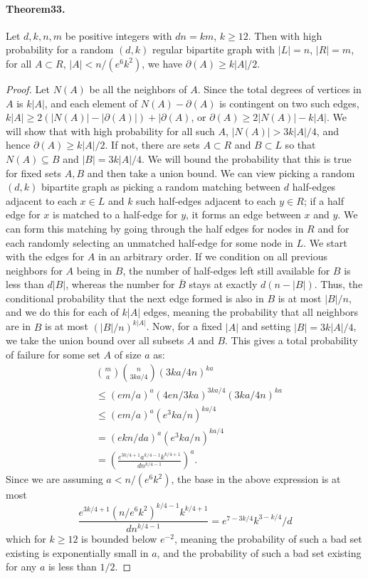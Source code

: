 \documentclass[10pt,a4paper]{article}
\begin{document}
\paragraph{Theorem33.} Let $d,k,n,m$ be positive integers with $dn=km$, $k\geq12$. Then with high probability for a random $(d,k)$ regular bipartite graph with $|L|=n$, $|R|=m$, for all $A\subset R$, $|A|<n/(e^6k^2)$, we have $\partial(A)\geq k|A|/2$.
\begin{proof}
Let $N(A)$ be all the neighbors of $A$. Since the total degrees of vertices in $A$ is $k|A|$, and each element of $N(A)-\partial(A)$ is contingent on two such edges, $k|A|\geq2(|N(A)|-|\partial(A)|)+|\partial(A)$, or $\partial(A)\geq2|N(A)|-k|A|$. We will show that with high probability for all such $A$, $|N(A)|>3k|A|/4$, and hence $\partial(A)\geq k|A|/2$.
If not, there are sets $A\subset R$ and $B\subset L$ so that $N(A)\subseteq B$ and $|B|=3k|A|/4$. We will bound the probability that this is true for fixed sets $A,B$ and then take a union bound. We can view picking a random $(d,k)$ bipartite graph as picking a random matching between $d$ half-edges adjacent to each $x\in L$ and $k$ such half-edges adjacent to each $y\in R$; if a half edge for $x$ is matched to a half-edge for $y$, it forms an edge between $x$ and $y$.
We can form this matching by going through the half edges for nodes in $R$ and for each randomly selecting an unmatched half-edge for some node in $L$. We start with the edges for $A$ in an arbitrary order. If we condition on all previous neighbors for $A$ being in $B$, the number of half-edges left still available for $B$ is less than $d|B|$, whereas the number for $\bar B$ stays at exactly $d(n-|B|)$. Thus, the conditional probability that the next edge formed is also in $B$ is at most $|B|/n$, and we do this for each of $k|A|$ edges, meaning the probability that all neighbors are in $B$ is at most $(|B|/n)^{k|A|}$.
Now, for a fixed $|A|$ and setting $|B|=3k|A|/4$, we take the union bound over all subsets $A$ and $B$. This gives a total probability of failure for some set $A$ of size $a$ as:
\begin{align*}
&\binom ma\binom n{3ka/4}(3ka/4n)^{ka}\\
&\leq(em/a)^a(4en/3ka)^{3ka/4}(3ka/4n)^{ka}\\
&\leq(em/a)^a(e^3ka/n)^{ka/4}\\
&=(ekn/da)^a(e^3ka/n)^{ka/4}\\
&=\left(\frac{e^{3k/4+1}a^{k/4-1}k^{k/4+1}}{dn^{k/4-1}}\right)^a.
\end{align*}
Since we are assuming $a<n/(e^6k^2)$, the base in the above expression is at most
\[\frac{e^{3k/4+1}(n/e^6k^2)^{k/4-1}k^{k/4+1}}{dn^{k/4-1}}=e^{7-3k/4}k^{3-k/4}/d\]
which for $k\geq12$ is bounded below $e^{-2}$, meaning the probability of such a bad set existing is exponentially small in $a$, and the probability of such a bad set existing for any $a$ is less than $1/2$.
\end{proof}
\end{document}
